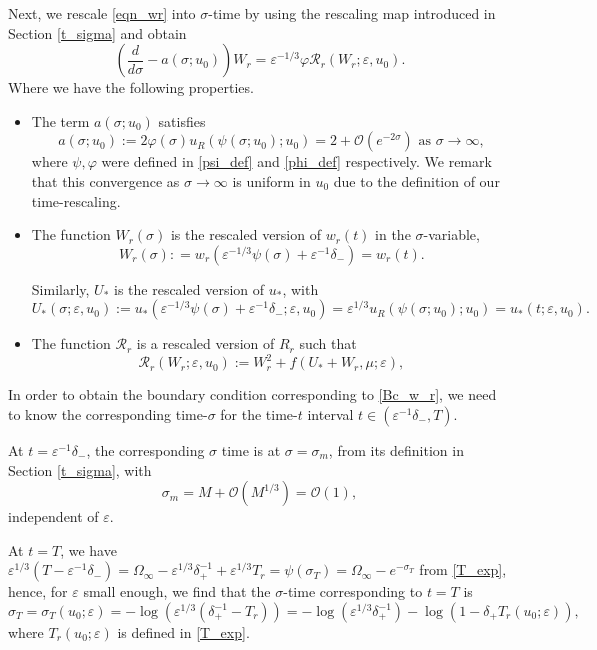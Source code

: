 \documentclass[letterpaper,11pt]{article}
\newcommand{\rmO}{\mathcal{O}}
\newcommand{\eps}{\varepsilon}
\newcommand{\Ral}{\mathcal{R}}
\numberwithin{equation}{section}
\theoremstyle{plain}
\begin{document}
Next, we rescale \eqref{eqn_wr} into $\sigma$-time by using the rescaling map introduced in Section \ref{t_sigma} and obtain
\begin{equation}\label{rescl_wr}
\left(\frac{d}{d\sigma} - a(\sigma; u_0)\right) W_r =\eps^{-1/3}\varphi \mathcal{R}_r(W_r; \eps,u_0).
\end{equation}
Where we have the following properties.
\begin{itemize}
\item The term $a(\sigma; u_0)$ satisfies
\begin{equation}\label{asy:a}
a(\sigma; u_0) := 2\varphi(\sigma)u_R(\psi(\sigma; u_0); u_0) =  2+\rmO(e^{-2\sigma}) \text{ as }\sigma \to \infty,
\end{equation}
where $\psi, \varphi$ were defined in \eqref{psi_def} and \eqref{phi_def} respectively. We remark that this convergence as $\sigma \to \infty$ is uniform in $u_0$ due to the definition of our time-rescaling.

\item The function $W_r(\sigma)$ is the rescaled version of $w_r(t)$ in the $\sigma$-variable, 
\[
W_r(\sigma): = w_r(\eps^{-1/3}\psi(\sigma)+\eps^{-1}\delta_-) = w_r(t) .
\] 

Similarly, $U_*$ is the rescaled version of $u_*$, with 
\[
U_*(\sigma;\eps,u_0) :=u_*(\eps^{-1/3}\psi(\sigma)+\eps^{-1}\delta_-;\eps,u_0)= \eps^{1/3}u_R(\psi(\sigma;u_0);u_0) = u_*(t;\eps,u_0).
\]

\item The function $\Ral_r$ is a rescaled version of $R_r$ such that 
\[
\mathcal{R}_r(W_r;\eps,u_0) := W_r^2 + f(U_*+W_r, \mu ; \eps),
\]
\end{itemize}
 
In order to obtain the boundary condition corresponding to \eqref{Bc_w_r}, we need to know the corresponding time-$\sigma$ for the time-$t$ interval $t\in (\eps^{-1}\delta_-, T)$.

At $t = \eps^{-1}\delta_-$, the corresponding $\sigma$ time is at $\sigma=\sigma_m$, from its definition in Section \ref{t_sigma}, with
\[
\sigma_m = M + \rmO(M^{1/3}) = \rmO(1),
\]
independent of $\eps$.

At $t=T$, we have $\eps^{1/3}(T-\eps^{-1}\delta_-) = \Omega_\infty -\eps^{1/3}\delta_+^{-1}+\eps^{1/3}T_r=\psi(\sigma_T) = \Omega_\infty-e^{-\sigma_T}$ from \eqref{T_exp}, hence, for $\eps$ small enough, we find that the $\sigma$-time corresponding to $t=T$ is 
\begin{equation}\label{def_sigm_T}
\sigma_T=\sigma_T(u_0;\eps) = -\log(\eps^{1/3}(\delta_+^{-1}-T_r)) = -\log(\eps^{1/3}\delta_+^{-1}) - \log(1-\delta_+ T_r(u_0;\eps)),
\end{equation}
where $T_r(u_0;\eps)$ is defined in \eqref{T_exp}.
\end{document}
